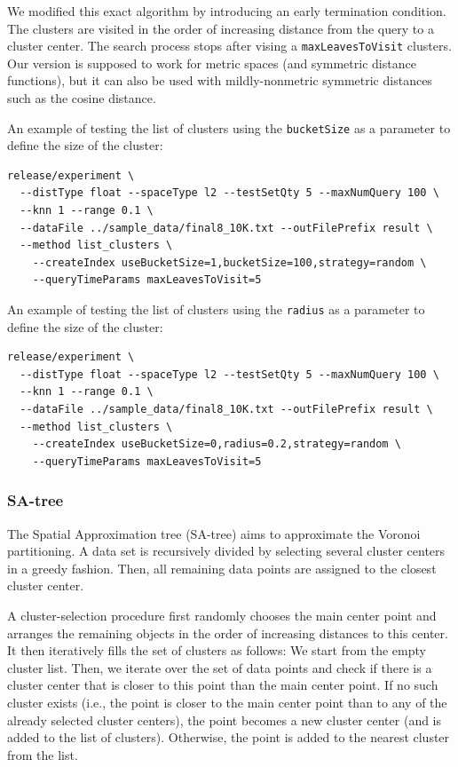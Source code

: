 \documentclass[runningheads,a4paper]{llncs}
\newcommand{\todonoteinline}[1]{\todo[color=red!40,inline,caption={TODO}]{#1}}
\newcommand{\ttt}[1]{\texttt{#1}}
\begin{document}
{We modified this exact algorithm by introducing an early termination condition.
The clusters are visited in the order of increasing distance from
the query to a cluster center.
The search process stops after vising a \ttt{maxLeavesToVisit} clusters.
Our version is supposed to work for metric spaces (and symmetric distance functions),
but it can also be used with mildly-nonmetric symmetric distances such as the cosine distance.

An example of testing the list of clusters using the \ttt{bucketSize} as a parameter to define
the size of the cluster:
{
\footnotesize
\begin{verbatim}
release/experiment \
  --distType float --spaceType l2 --testSetQty 5 --maxNumQuery 100 \
  --knn 1 --range 0.1 \
  --dataFile ../sample_data/final8_10K.txt --outFilePrefix result \
  --method list_clusters \
    --createIndex useBucketSize=1,bucketSize=100,strategy=random \
    --queryTimeParams maxLeavesToVisit=5
\end{verbatim}
}
An example of testing the list of clusters using the \ttt{radius} as a parameter to define
the size of the cluster:
{
\footnotesize
\begin{verbatim}
release/experiment \
  --distType float --spaceType l2 --testSetQty 5 --maxNumQuery 100 \
  --knn 1 --range 0.1 \
  --dataFile ../sample_data/final8_10K.txt --outFilePrefix result \
  --method list_clusters \
    --createIndex useBucketSize=0,radius=0.2,strategy=random \
    --queryTimeParams maxLeavesToVisit=5
\end{verbatim}
}

\todonoteinline{Add a description of new clustering methods}

\subsubsection{SA-tree}
The Spatial Approximation tree (SA-tree)  \cite{navarro2002searching} aims
to approximate the Voronoi partitioning.
A data set is recursively divided by selecting several cluster centers in a greedy fashion.
Then, all remaining data points are assigned to the closest cluster center.

A cluster-selection procedure first randomly chooses the main center point and arranges the
remaining objects in the order of increasing distances to this center.
It then iteratively fills the set of clusters as follows: We start from the empty cluster 
list. Then, we iterate over the set of data points and check if there is a cluster center that
is closer to this point than the main center point. 
If no such cluster exists (i.e., the point is closer to the main center point than to any
of the already selected cluster centers), the point becomes a new cluster center 
(and is added to the list of clusters).
Otherwise, the point is added to the nearest cluster from the list.

}
\end{document}
